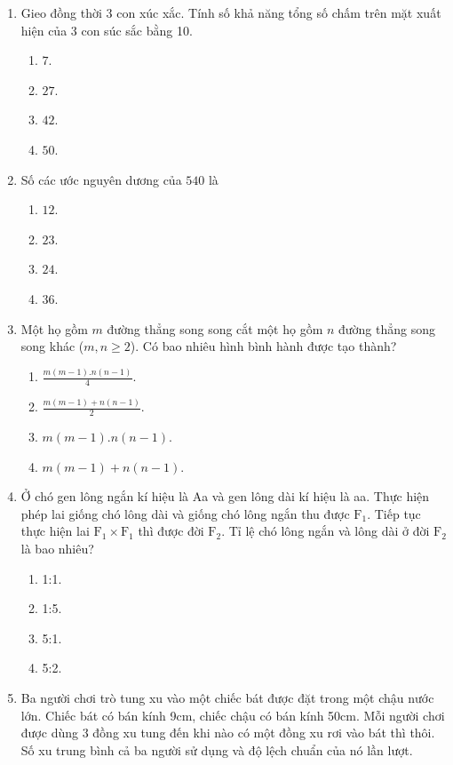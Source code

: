 \begin{enumerate}[label=\textbf{Câu \arabic*.},align=left,left=0cm..0cm,itemindent=*]
	\item Gieo đồng thời 3 con xúc xắc. Tính số khả năng tổng số chấm trên mặt xuất hiện của 3 con súc sắc bằng 10.
	\begin{enumerate}[label=\textbf{\Alph*.},align=left,left=1cm..0cm,itemindent=*]
		\item $7$. \item $27$. \item $42$. \item $50$.
	\end{enumerate}
	\item Số các ước nguyên dương của $540$ là
	\begin{enumerate}[label=\textbf{\Alph*.},align=left,left=1cm..0cm,itemindent=*]
		\item $12$. \item $23$. \item $24$. \item $36$.
	\end{enumerate}
	\item Một họ gồm $m$ đường thẳng song song cắt một họ gồm $n$ đường thẳng song song khác ($m,n\geqslant 2$). Có bao nhiêu hình bình hành được tạo thành?
	\begin{enumerate}[label=\textbf{\Alph*.},align=left,left=1cm..0cm,itemindent=*]
		\item $\frac{m(m-1).n(n-1)}{4}$. \item $\frac{m(m-1)+n(n-1)}{2}$. \item $m(m-1).n(n-1)$. \item $m(m-1)+n(n-1)$.
	\end{enumerate}
	\item Ở chó gen lông ngắn kí hiệu là Aa và gen lông dài kí hiệu là aa. Thực hiện phép lai giống chó lông dài và giống chó lông ngắn thu được $\text{F}_1$. Tiếp tục thực hiện lai $\text{F}_1\times \text{F}_1$ thì được đời $\text{F}_2$. Tỉ lệ chó lông ngắn và lông dài ở đời $\text{F}_2$ là bao nhiêu?
	\begin{enumerate}[label=\textbf{\Alph*.},align=left,left=1cm..0cm,itemindent=*]
		\item 1:1. \item 1:5. \item 5:1. \item 5:2.
	\end{enumerate}
	\item Ba người chơi trò tung xu vào một chiếc bát được đặt trong một chậu nước lớn. Chiếc bát có bán kính 9cm, chiếc chậu có bán kính 50cm. Mỗi người chơi được dùng 3 đồng xu tung đến khi nào có một đồng xu rơi vào bát thì thôi. Số xu trung bình cả ba người sử dụng và độ lệch chuẩn của nó lần lượt.\par

\end{enumerate}
